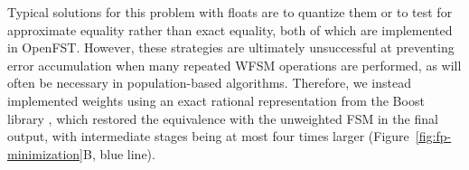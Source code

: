 \documentclass{llncs}
\begin{document}
Typical solutions for this problem with floats are to quantize them or to test for 
approximate equality rather than exact equality, both of which are implemented in OpenFST.
However, these strategies are ultimately unsuccessful at preventing error accumulation
when many repeated WFSM operations are performed, as will often be necessary in 
population-based algorithms. 
Therefore, we instead implemented weights using an exact rational representation 
from the Boost library \cite{Gurtovoy2002},
which restored the equivalence with the unweighted FSM in the final output,
 with  intermediate stages being at most four times larger 
(Figure~\ref{fig:fp-minimization}B, blue line).



\end{document}
